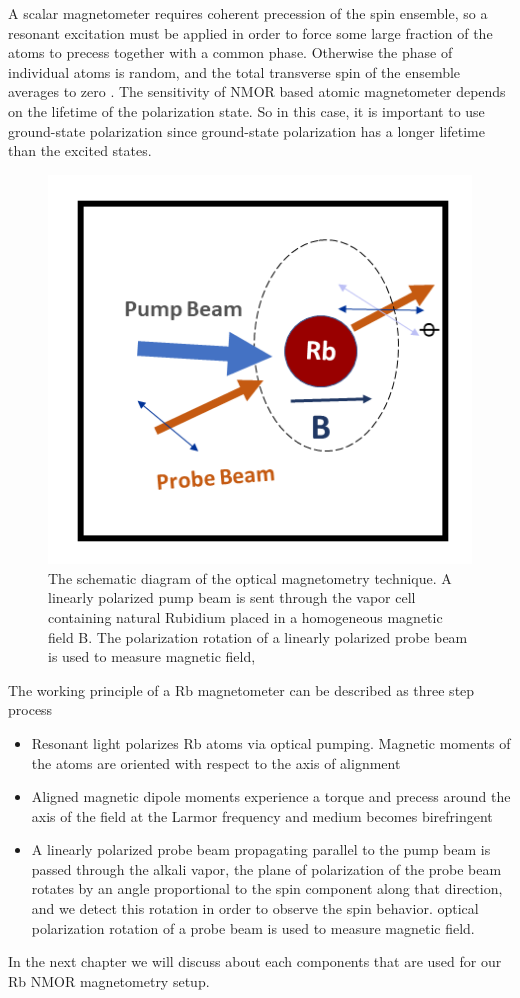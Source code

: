 A scalar magnetometer requires coherent precession of the spin ensemble, so a resonant excitation must be applied in order to force some large fraction of the atoms to precess together with a common phase. Otherwise the phase of individual atoms is random, and the total transverse spin of the ensemble averages to zero . The sensitivity of NMOR based atomic magnetometer depends on the lifetime of the polarization state. So in this case, it is important to use ground-state polarization since ground-state polarization has a longer lifetime than the excited states. 
\begin{figure}[h]
\centering
\includegraphics[width=0.55\linewidth]{figures/optical_pumping}
\caption{The schematic diagram of the optical magnetometry technique.
  A linearly polarized pump beam is sent through the vapor cell
  containing natural Rubidium placed in a homogeneous magnetic field
  B.  The polarization rotation of a linearly polarized probe beam is
  used to measure magnetic field,\label{Rb magnetometry}}
\end{figure}
The working principle of a Rb magnetometer can be described as three step process
\begin{itemize}
\item
Resonant light polarizes Rb atoms via optical pumping. Magnetic
moments of the atoms are oriented with respect to the axis of
alignment
\end{itemize}
\begin{itemize}
\item Aligned magnetic dipole moments experience a torque and precess around the axis of the field at the Larmor frequency and medium becomes birefringent
\end{itemize}
\begin{itemize}
\item A linearly polarized probe beam propagating parallel to the
pump beam is passed through the alkali vapor, the plane of polarization of the probe beam
rotates by an angle proportional to the spin component along that direction, and we detect
this rotation in order to observe the spin behavior. optical polarization rotation of a probe beam is used to measure magnetic field.
\end{itemize}

In the next chapter we will discuss about each components that are used for our Rb NMOR magnetometry setup.

